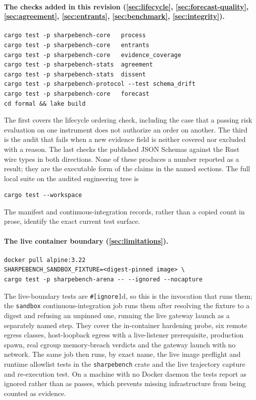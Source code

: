 \paragraph{The checks added in this revision (\cref{sec:lifecycle}, \cref{sec:forecast-quality}, \cref{sec:agreement}, \cref{sec:entrants}, \cref{sec:benchmark}, \cref{sec:integrity}).}
\begin{verbatim}
cargo test -p sharpebench-core   process
cargo test -p sharpebench-core   entrants
cargo test -p sharpebench-core   evidence_coverage
cargo test -p sharpebench-stats  agreement
cargo test -p sharpebench-stats  dissent
cargo test -p sharpebench-protocol --test schema_drift
cargo test -p sharpebench-core   forecast
cd formal && lake build
\end{verbatim}
The first covers the lifecycle ordering check, including the case that a passing risk evaluation on one instrument does not authorize an order on another. The third is the audit that fails when a new evidence field is neither covered nor excluded with a reason. The last checks the published JSON Schemas against the Rust wire types in both directions. None of these produces a number reported as a result; they are the executable form of the claims in the named sections. The full local suite on the audited engineering tree is
\begin{verbatim}
cargo test --workspace
\end{verbatim}
The manifest and continuous-integration records, rather than a copied count in prose, identify the exact current test surface.

\paragraph{The live container boundary (\cref{sec:limitations}).}
\begin{verbatim}
docker pull alpine:3.22
SHARPEBENCH_SANDBOX_FIXTURE=<digest-pinned image> \
cargo test -p sharpebench-arena -- --ignored --nocapture
\end{verbatim}
The live-boundary tests are \texttt{\#[ignore]}d, so this is the invocation that runs them; the \texttt{sandbox} continuous-integration job runs them after resolving the fixture to a digest and refusing an unpinned one, running the live gateway launch as a separately named step. They cover the in-container hardening probe, six remote egress classes, host-loopback egress with a live-listener prerequisite, production spawn, real cgroup memory-breach verdicts and the gateway launch with no network. The same job then runs, by exact name, the live image preflight and runtime allowlist tests in the \texttt{sharpebench} crate and the live trajectory capture and re-execution test. On a machine with no Docker daemon the tests report as ignored rather than as passes, which prevents missing infrastructure from being counted as evidence.

